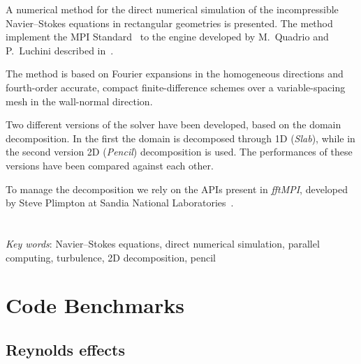 \documentclass[a4paper,twosides,openright,titlepage]{book}
\newenvironment{abstract}%
	{\cleardoublepage%
		\thispagestyle{empty}%
		\null \vfill\begin{center}%
		\bfseries \abstractname \end{center}}%
	{\vfill\null}
\begin{document}
\begin{abstract}
\hrulefill

A numerical method for the direct numerical simulation of the incompressible Navier–Stokes equations in rectangular geometries is presented. The method implement the MPI Standard~\cite{MPI} to the engine developed by M.~Quadrio and P.~Luchini described in~\cite{cpl:presentazione}. 

The method is based on Fourier expansions in the homogeneous directions and fourth-order accurate, compact finite-difference schemes over a variable-spacing mesh in the wall-normal direction. 

Two different versions of the solver have been developed, based on the domain decomposition.  In the first the domain is decomposed through 1D (\emph{Slab}), while in the second version 2D (\emph{Pencil}) decomposition is used.
The performances of these versions have been compared against each other.

To manage the decomposition we rely on the APIs present in \emph{fftMPI}, developed by Steve Plimpton at Sandia National Laboratories~\cite{fftMPI}.
\\
\\
\\
\emph{Key words}: Navier–Stokes equations, direct numerical simulation, parallel computing, turbulence, 2D decomposition, pencil 

\hrulefill
\end{abstract}




\tableofcontents 
\listoffigures 
\listoftables



\mainmatter



%

\chapter{Code Benchmarks}







\section{Reynolds effects}



\backmatter
{} 
\printbibliography
\end{document}
